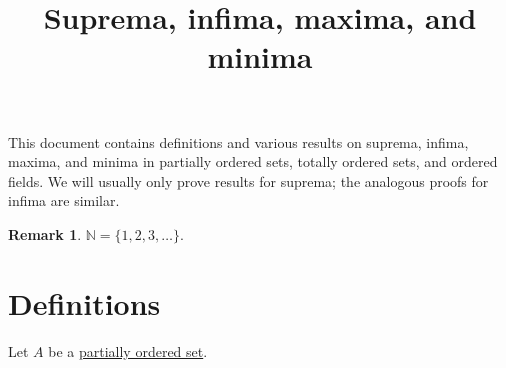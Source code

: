 \documentclass[12pt]{article}
\title{Suprema, infima, maxima, and minima}
\author{}
\date{\vspace{-24mm}}
\theoremstyle{definition}
\newtheorem*{remark}{Remark}
\begin{document}
\maketitle

\tableofcontents

\newpage

This document contains definitions and various results on suprema, infima, maxima, and minima in partially ordered sets, totally ordered sets, and ordered fields. We will usually only prove results for suprema; the analogous proofs for infima are similar.

\begin{remark}
    \( \mathbb{N} = \{ 1, 2, 3, \ldots \} \).
\end{remark}

\section{Definitions}
\label{sec:definitions}

Let \( A \) be a \href{https://en.wikipedia.org/wiki/Partially_ordered_set}{partially ordered set}.
\end{document}
